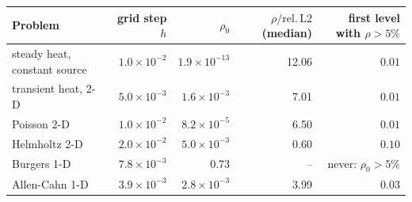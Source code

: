 \begin{tabular}{lrrrr}
\toprule
Problem & grid step $h$ & $\rho_0$ & $\rho/\mathrm{rel.\,L2}$ (median) & first level with $\rho>5\%$ \\
\midrule
steady heat, constant source & $1.0\times10^{-2}$ & $1.9\times10^{-13}$ & 12.06 & $0.01$ \\
transient heat, 2-D & $5.0\times10^{-3}$ & $1.6\times10^{-3}$ & 7.01 & $0.01$ \\
Poisson 2-D & $1.0\times10^{-2}$ & $8.2\times10^{-5}$ & 6.50 & $0.01$ \\
Helmholtz 2-D & $2.0\times10^{-2}$ & $5.0\times10^{-3}$ & 0.60 & $0.10$ \\
Burgers 1-D & $7.8\times10^{-3}$ & 0.73 & -- & never: $\rho_0>5\%$ \\
Allen-Cahn 1-D & $3.9\times10^{-3}$ & $2.8\times10^{-3}$ & 3.99 & $0.03$ \\
\bottomrule
\end{tabular}
